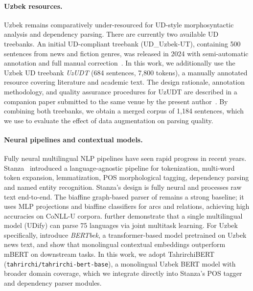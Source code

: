 \documentclass[runningheads]{llncs}
\begin{document}
\paragraph{Uzbek resources.}
Uzbek remains comparatively under-resourced for UD-style morphosyntactic analysis and dependency parsing. There are currently two available UD treebanks. An initial UD-compliant treebank (UD\_Uzbek-UT), containing 500 sentences from news and fiction genres, was released in 2024 with semi-automatic annotation and full manual correction~\cite{akhundjanova-talamo-2025-universal}. In this work, we additionally use the Uzbek UD treebank \emph{UzUDT} (684 sentences, 7{,}800 tokens), a manually annotated resource covering literature and academic text. The design rationale, annotation methodology, and quality assurance procedures for UzUDT are described in a companion paper submitted to the same venue by the present author~\cite{matlatipov2025goldudt}. By combining both treebanks, we obtain a merged corpus of 1{,}184 sentences, which we use to evaluate the effect of data augmentation on parsing quality.

\paragraph{Neural pipelines and contextual models.}
Fully neural multilingual NLP pipelines have seen rapid progress in recent years.  Stanza~\cite{Qi2020-zr} introduced a language-agnostic pipeline for tokenization, multi-word token expansion, lemmatization, POS morphological tagging, dependency parsing and named entity recognition.   Stanza's design is fully neural and processes raw text end-to-end.  The biaffine graph-based parser of \cite{DBLP:conf/iclr/DozatM17} remains a strong baseline; it uses MLP projections and biaffine classifiers for arcs and relations, achieving high accuracies on CoNLL-U corpora.  \cite{kondratyuk-straka-2019-75} further demonstrate that a single multilingual model (UDify) can parse 75 languages via joint multitask learning.   For Uzbek specifically, \cite{kuriyozov-etal-2024-bertbek} introduce \textit{BERTbek}, a transformer-based model pretrained on Uzbek news text, and show that monolingual contextual embeddings outperform mBERT on downstream tasks. In this work, we adopt TahrirchiBERT (\texttt{tahrirchi/tahrirchi-bert-base}), a monolingual Uzbek BERT model with broader domain coverage, which we integrate directly into Stanza's POS tagger and dependency parser modules.
\end{document}
